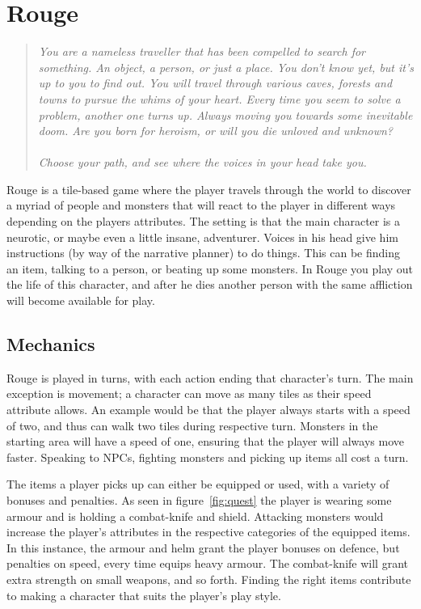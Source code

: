 \section{Rouge}
\label{sec:PCG:Rouge}
\begin{quotation}
\textsl{You are a nameless traveller that has been compelled to search for something.
An object, a person, or just a place.
You don't know yet, but it's up to you to find out.
You will travel through various caves, forests and towns to pursue the whims of your heart.
Every time you seem to solve a problem, another one turns up.
Always moving you towards some inevitable doom.
Are you born for heroism, or will you die unloved and unknown?
\\\\
Choose your path, and see where the voices in your head take you.}
\end{quotation}
Rouge is a tile-based \rogue game where the player travels through the world to discover a myriad of people and monsters that will react to the player in different ways depending on the players attributes. 
The setting is that the main character is a neurotic, or maybe even a little insane, adventurer.
Voices in his head give him instructions (by way of the narrative planner) to do things.
This can be finding an item, talking to a person, or beating up some monsters. 
In Rouge you play out the life of this character, and after he dies another person with the same affliction will become available for play. 

\subsection{Mechanics}
Rouge is played in turns, with each action ending that character's turn. 
The main exception is movement; a character can move as many tiles as their speed attribute allows. 
An example would be that the player always starts with a speed of two, and thus can walk two tiles during \his respective turn. 
Monsters in the starting area will have a speed of one, ensuring that the player will always move faster. 
Speaking to NPCs, fighting monsters and picking up items all cost a turn. 

The items a player picks up can either be equipped or used, with a variety of bonuses and penalties. 
As seen in figure~\ref{fig:quest} the player is wearing some armour and is holding a combat-knife and shield. 
Attacking monsters would increase the player's attributes in the respective categories of the equipped items. 
In this instance, the armour and helm grant the player bonuses on defence, but penalties on speed, every time \he equips heavy armour. 
The combat-knife will grant extra strength on small weapons, and so forth. 
Finding the right items contribute to making a character that suits the player's play style. 

